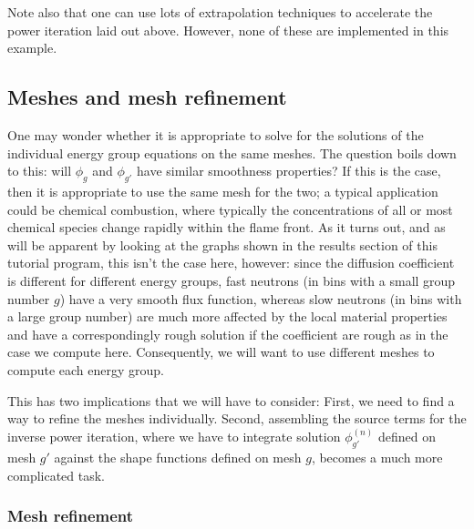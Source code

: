 \documentclass{article}
\begin{document}
Note also that one can use lots of extrapolation techniques to accelerate the
power iteration laid out above. However, none of these are implemented in this
example.


\subsection{Meshes and mesh refinement}

One may wonder whether it is appropriate to solve for the solutions of the
individual energy group equations on the same meshes. The question boils down
to this: will $\phi_g$ and $\phi_{g'}$ have similar smoothness properties? If
this is the case, then it is appropriate to use the same mesh for the two; a
typical application could be chemical combustion, where typically the
concentrations of all or most chemical species change rapidly within the flame
front. As it turns out, and as will be apparent by looking at the
graphs shown in the results section of this tutorial program, this isn't the
case here, however: since the diffusion coefficient is different for different
energy groups, fast neutrons (in bins with a small group number $g$) have a very
smooth flux function, whereas slow neutrons (in bins with a large group
number) are much more affected by the local material properties and have a
correspondingly rough solution if the coefficient are rough as in the case we
compute here. Consequently, we will want to use different meshes to compute
each energy group.

This has two implications that we will have to consider: First, we need to
find a way to refine the meshes individually. Second, assembling the source
terms for the inverse power iteration, where we have to integrate solution
$\phi_{g'}^{(n)}$ defined on mesh $g'$ against the shape functions defined on
mesh $g$, becomes a much more complicated task.


\subsubsection{Mesh refinement}
\end{document}
